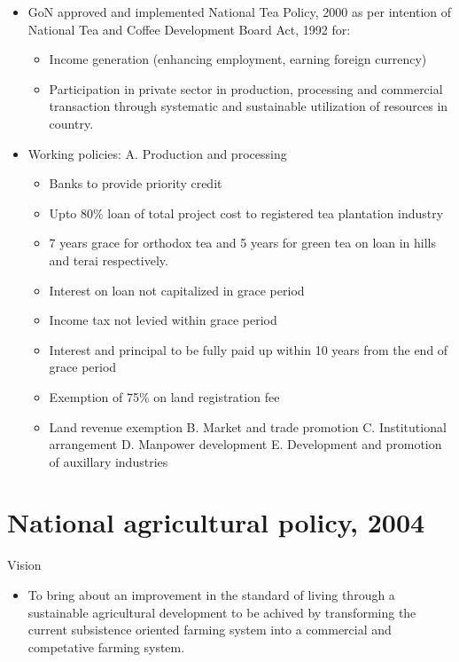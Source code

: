 \documentclass[
  openany]{book}
\providecommand{\tightlist}{%
  \setlength{\itemsep}{0pt}\setlength{\parskip}{0pt}}
\begin{document}
\begin{itemize}
\tightlist
\item
  GoN approved and implemented National Tea Policy, 2000 as per intention of National Tea and Coffee Development Board Act, 1992 for:

  \begin{itemize}
  \tightlist
  \item
    Income generation (enhancing employment, earning foreign currency)
  \item
    Participation in private sector in production, processing and commercial transaction through systematic and sustainable utilization of resources in country.
  \end{itemize}
\item
  Working policies:
  A. Production and processing

  \begin{itemize}
  \tightlist
  \item
    Banks to provide priority credit
  \item
    Upto 80\% loan of total project cost to registered tea plantation industry
  \item
    7 years grace for orthodox tea and 5 years for green tea on loan in hills and terai respectively.
  \item
    Interest on loan not capitalized in grace period
  \item
    Income tax not levied within grace period
  \item
    Interest and principal to be fully paid up within 10 years from the end of grace period
  \item
    Exemption of 75\% on land registration fee
  \item
    Land revenue exemption
    B. Market and trade promotion
    C. Institutional arrangement
    D. Manpower development
    E. Development and promotion of auxillary industries
  \end{itemize}
\end{itemize}

\hypertarget{national-agricultural-policy-2004}{%
\section{National agricultural policy, 2004}\label{national-agricultural-policy-2004}}

Vision

\begin{itemize}
\tightlist
\item
  To bring about an improvement in the standard of living through a sustainable agricultural development to be achived by transforming the current subsistence oriented farming system into a commercial and competative farming system.
\end{itemize}
\end{document}

